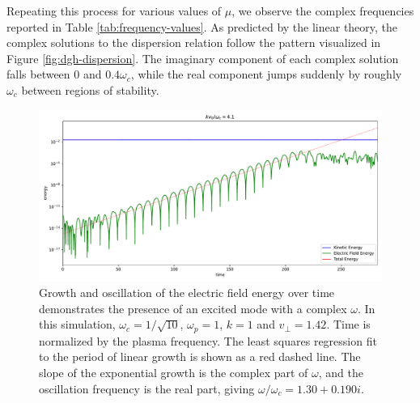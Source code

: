 \documentclass[%
 reprint,
 amsmath,amssymb,
 aps,
]{revtex4-2}
\begin{document}
Repeating this process for various values of $\mu$, we observe the complex frequencies reported in Table \ref{tab:frequency-values}. As predicted by the linear theory, the complex solutions to the dispersion relation follow the pattern visualized in Figure \ref{fig:dgh-dispersion}. The imaginary component of each complex solution falls between $0$ and $0.4 \omega_c$, while the real component jumps suddenly by roughly $\omega_c$ between regions of stability.

\begin{figure}
\includegraphics[width=0.9\linewidth]{proj4/dgh_4.10.pdf}
\caption{\label{fig:dory-guest-harris-4.10}Growth and oscillation of the electric field energy over time demonstrates the presence of an excited mode with a complex $\omega$. In this simulation, $\omega_c = 1/\sqrt{10}$, $\omega_p = 1$, $k = 1$ and $v_\perp = 1.42$. Time is normalized by the plasma frequency. The least squares regression fit to the period of linear growth is shown as a red dashed line. The slope of the exponential growth is the complex part of $\omega$, and the oscillation frequency is the real part, giving $\omega / \omega_c = 1.30 + 0.190i$.}
\end{figure}
\end{document}
